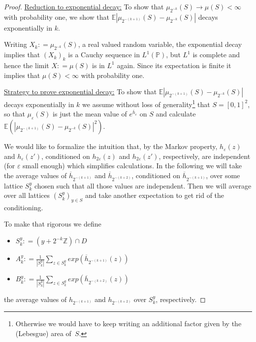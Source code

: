 \documentclass[11pt,reqno]{amsart}
\numberwithin{equation}{section}
\newcommand{\deq}{\mathrel{\mathop:}=}
\newcommand{\eps}{\varepsilon}
\begin{document}
\begin{proof}
	
	\underline{Reduction to exponential decay:} To show that $\mu_{2^{-k}}(S)\rightarrow\mu(S)<\infty$ with probability one, we show that $\mathbb E|\mu_{2^{-(k+1)}}(S)-\mu_{2^{-k}}(S)|$ decays exponentially in $k$.
	
	Writing $X_k\deq \mu_{2^{-k}}(S)$, a real valued random variable, the exponential decay implies that $(X_k)_k$ is a Cauchy sequence in $L^1(\mathbb P)$, but $L^1$ is complete and hence the limit $X\deq\mu(S)$ is in $L^1$ again. Since its expectation is finite it implies that $\mu(S)<\infty$ with probability one.
	
	\underline{Strategy to prove exponential decay:} To show that $\mathbb E|\mu_{2^{-(k+1)}}(S)-\mu_{2^{-k}}(S)|$ decays exponentially in $k$ we assume without loss of generality\footnote{Otherwise we would have to keep writing an additional factor given by the (Lebesgue) area of~$S$.} that $S=[0,1]^2$, so that $\mu_\eps(S)$ is just the mean value of $e^{\overline h_\eps}$ on $S$ and calculate $\mathbb E(|\mu_{2^{-(k+1)}}(S)-\mu_{2^{-k}}(S)|^2)$. %
	
	We would like to formalize the intuition that, by the Markov property, $h_\eps(z)$ and $h_\eps(z')$, conditioned on $h_{2\eps}(z)$ and $h_{2\eps}(z')$, respectively, are independent (for $\eps$ small enough) which simplifies calculations. In the following we will take the average values of $\overline h_{2^{-(k+1)}}$ and $\overline h_{2^{-(k+2)}}$, conditioned on $\overline h_{2^{-(k+1)}}$, over some lattice $S_k^y$ chosen such that all those values are independent. Then we will average over all lattices $(S_k^y)_{y\in S}$ and take another expectation to get rid of the conditioning.
	
	To make that rigorous we define \begin{itemize}
		\item $S_k^y\deq (y+2^{-k}\mathbb Z)\cap D$
		\item $A_k^y\deq \frac{1}{|S_k^y|}\sum_{z\in S_k^y}exp(\overline h_{2^{-(k+1)}}(z))$
		\item $B_k^y\deq \frac{1}{|S_k^y|}\sum_{z\in S_k^y}exp(\overline h_{2^{-(k+2)}}(z))$
	\end{itemize}
	the average values of $h_{2^{-(k+1)}}$ and $h_{2^{-(k+2)}}$ over $S_k^y$, respectively.
	

\end{proof}
\end{document}
